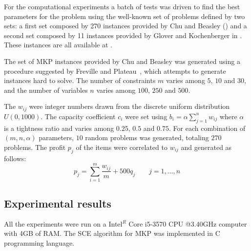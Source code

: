 For the computational experiments a batch of tests was driven to find the best
parameters for the problem using the well-known set of problems defined by two sets:
a first set composed by 270 instances provided by Chu and Beasley (\cite{Chu-Beasley-1998})
and a second set composed by 11 instances provided by Glover and Kochenberger in
\cite{glover1996critical}.
These instances are all available at \cite{ORLibrary}.

The set of MKP instances provided by Chu and Beasley was generated using a
procedure suggested by Freville and Plateau~\cite{freville1994efficient}, which
attempts to generate instances hard to solve.
The number of constraints $m$ varies among $5$, $10$ and $30$, and the number
of variables $n$ varies among $100$, $250$ and $500$.

The $w_{ij}$ were integer numbers drawn from the discrete uniform distribution
$U(0, 1000)$.
The capacity coefficient $c_i$ were set using
$b_i = \alpha\sum_{j=1}^{n} w_{ij}$ where $\alpha$ is a tightness ratio and
varies among $0.25$, $0.5$ and $0.75$.
For each combination of $(m,n,\alpha)$ parameters, $10$ random problems was generated,
totaling $270$ problems.
The profit $p_j$ of the items were correlated to $w_{ij}$ and generated as follows:
\begin{displaymath}
  p_j = \sum_{i=1}^m \frac{w_{ij}}{m} + 500q_j \qquad j = 1, \ldots, n
\end{displaymath}



\subsection{Experimental results}

All the experiments were run on a Intel$^R$ Core i5-3570 CPU @3.40GHz computer
with 4GB of RAM.
The SCE algorithm for MKP was implemented in C programming language.

